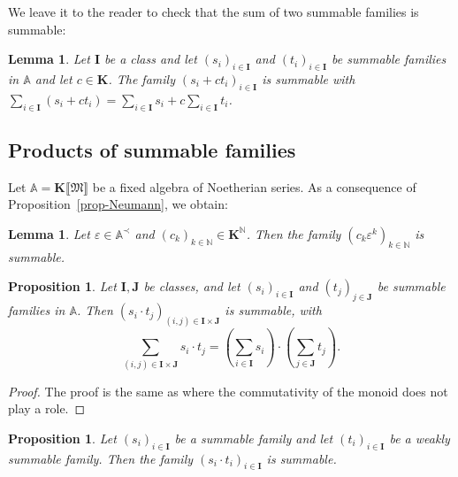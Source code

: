 \documentclass{article}
\newtheorem{proposition}[theorem]{Proposition}
\newtheorem{lemma}[theorem]{Lemma}
\theoremstyle{remark}\newtheorem*{convention*}{Convention}
\begin{document}
We leave it to the reader to check that the sum of two summable families is
summable:

\begin{lemma}
  \label{lem-sum-sum}Let $\mathbf{I}$ be a class and let $(s_i)_{i \in
  \mathbf{I}}$ and $(t_i)_{i \in \mathbf{I}}$ be summable families in
  $\mathbb{A}$ and let $c \in \mathbf{K}$. The family $(s_i + ct_i)_{i \in
  \mathbf{I}}$ is summable with $\sum_{i \in \mathbf{I}} (s_i + ct_i) =
  \sum_{i \in \mathbf{I}} s_i + c \sum_{i \in \mathbf{I}} t_i$.
\end{lemma}

\subsection{Products of summable families}

Let $\mathbb{A}= \mathbf{K} \llbracket \mathfrak{M} \rrbracket$ be a fixed
algebra of Noetherian series. As a consequence of Proposition~\ref{prop-Neumann}, we
obtain:

\begin{lemma}
  \label{lem-Neumann-series}Let $\varepsilon \in \mathbb{A}^{\prec}$ and
  $(c_k)_{k \in \mathbb{N}} \in \mathbf{K}^{\mathbb{N}}$. Then the family
  $(c_k \varepsilon^k)_{k \in \mathbb{N}}$ is summable.
\end{lemma}

\begin{proposition}
  \label{prop-sum-prod}Let $\mathbf{I}, \mathbf{J}$ be classes, and let
  $(s_i)_{i \in \mathbf{I}}$ and $(t_j)_{j \in \mathbf{J}}$ be summable
  families in $\mathbb{A}$. Then $(s_i \cdot t_j)_{(i, j) \in \mathbf{I}
  \times \mathbf{J}}$ is summable, with
  \[ \sum_{(i, j) \in \mathbf{I} \times \mathbf{J}} s_i \cdot t_j = \left(
     \sum_{i \in \mathbf{I}} s_i \right) \cdot \left( \sum_{j \in \mathbf{J}}
     t_j \right) . \]
\end{proposition}

\begin{proof}
  The proof is the same as {\cite[Proposition~3.3]{vdH:noeth}} where the
  commutativity of the monoid does not play a role.
\end{proof}

\begin{proposition}
  \label{prop-sum-weaksum}Let $(s_i)_{i \in \mathbf{I}}$ be a summable family
  and let $(t_i)_{i \in \mathbf{I}}$ be a weakly summable family. Then the
  family $(s_i \cdot t_i)_{i \in \mathbf{I}}$ is summable.
\end{proposition}
\end{document}
